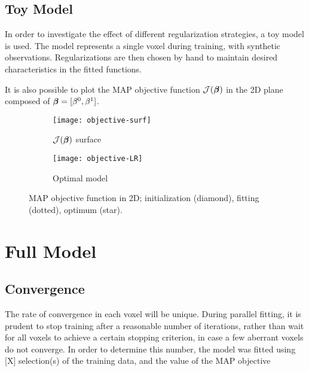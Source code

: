 \subsection{Toy Model}\label{ss:toyreg}
In order to investigate the effect of different regularization strategies, a toy model is used. The model represents a single voxel during training, with synthetic observations. Regularizations are then chosen by hand to maintain desired characteristics in the fitted functions. 

\par
It is also possible to plot the MAP objective function $\mathcal{J}(\bm{\beta})$ in the 2D plane composed of $\bm{\beta} = [\beta^0,\beta^1]$.
\begin{figure}
  \centering
  \begin{subfigure}{\plotwidth}\centering\texttt{[image: objective-surf]}\caption{$\mathcal{J}(\bm{\beta})$ surface}\label{fig:obj-surf}\end{subfigure}
  \begin{subfigure}{\plotwidth}\centering\texttt{[image: objective-LR]}  \caption{Optimal model}\label{fig:obj-lr}\end{subfigure}
  \caption{MAP objective function in 2D; initialization (diamond), fitting (dotted), optimum (star).}
\end{figure}


\section{Full Model}
\subsection{Convergence}
The rate of convergence in each voxel will be unique. During parallel fitting, it is prudent to stop training after a reasonable number of iterations, rather than wait for all voxels to achieve a certain stopping criterion, in case a few aberrant voxels do not converge. In order to determine this number, the model was fitted using [X] selection(s) of the training data, and the value of the MAP objective 


